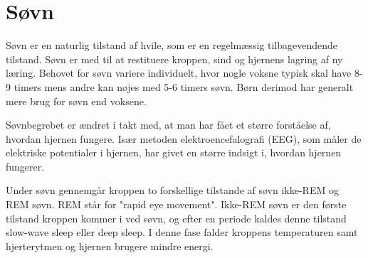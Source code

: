\section{Søvn}\label{sec:Soevn_generelt}
Søvn er en naturlig tilstand af hvile, som er en regelmæssig tilbagevendende tilstand. Søvn er med til at restituere kroppen, sind og hjernens lagring af ny læring. Behovet for søvn variere individuelt, hvor nogle voksne typisk skal have 8-9 timers mens andre kan nøjes med 5-6 timers søvn. Børn derimod har generalt mere brug for søvn end voksene. 

Søvnbegrebet er ændret i takt med, at man har fået et større forståelse af, hvordan hjernen fungere. Især metoden elektroencefalografi (EEG), som måler de elektriske potentialer i hjernen, har givet en større indsigt i, hvordan hjernen fungerer.

Under søvn gennemgår kroppen to forskellige tilstande af søvn ikke-REM og REM søvn. REM står for "rapid eye movement". Ikke-REM søvn er den første tilstand kroppen kommer i ved søvn, og efter en periode kaldes denne tilstand slow-wave sleep eller deep sleep. I denne fase falder kroppens temperaturen samt hjerterytmen og hjernen brugere mindre energi.   
